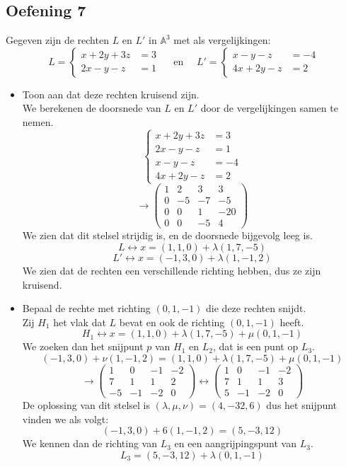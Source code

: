 \documentclass[main.tex]{subfiles}
\begin{document}
\subsection*{Oefening 7}
Gegeven zijn de rechten $L$ en $L'$ in $\mathbb{A}^{3}$ met als vergelijkingen:
\[
L = 
\left\{
\begin{array}{cl}
x + 2y + 3z &= 3\\
2x -y -z &= 1    
\end{array}
\right.
\quad\text{ en }\quad
L' = 
\left\{
\begin{array}{cl}
x - y - z &= -4\\
4x +2y -z &= 2
\end{array}
\right.
\]
\begin{itemize}
\item Toon aan dat deze rechten kruisend zijn.\\
We berekenen de doorsnede van $L$ en $L'$ door de vergelijkingen samen te nemen.
\[
\left\{
\begin{array}{cl}
x + 2y + 3z &= 3\\
2x -y -z &= 1\\
x - y - z &= -4\\
4x +2y -z &= 2
\end{array}
\right.
\]
\[
\rightarrow
\begin{pmatrix}
  1 & 2 & 3 & 3\\
  0 &-5 &-7 &-5\\
  0 & 0 & 1 & -20\\
  0 & 0 &-5 & 4
\end{pmatrix}
\]
We zien dat dit stelsel strijdig is, en de doorsnede bijgevolg leeg is.
\[ L \leftrightarrow x = (1,1,0) + \lambda(1,7,-5) \]
\[ L' \leftrightarrow x = (-1,3,0) + \lambda(1,-1,2) \]
We zien dat de rechten een verschillende richting hebben, dus ze zijn kruisend.

\item Bepaal de rechte met richting $(0,1,-1)$ die deze rechten snijdt.\\
Zij $H_{1}$ het vlak dat $L$ bevat en ook de richting $(0,1,-1)$ heeft.
\[ H_{1} \leftrightarrow x = (1,1,0) + \lambda(1,7,-5) + \mu (0,1,-1) \]
We zoeken dan het snijpunt $p$ van $H_{1}$ en $L_{2}$, dat is een punt op $L_{3}$.
\[ (-1,3,0) + \nu(1,-1,2) = (1,1,0) + \lambda(1,7,-5) + \mu (0,1,-1) \]
\[
\rightarrow
\begin{pmatrix}
  1 & 0 &-1 &-2\\
  7 & 1 & 1 & 2\\
  -5 &-1 &-2 & 0
\end{pmatrix}
\leftrightarrow
\begin{pmatrix}
  1 & 0 &-1 &-2\\
  7 & 1 & 1 & 3\\
  5 &-1 &-2 & 0
\end{pmatrix}
\]
De oplossing van dit stelsel is $(\lambda,\mu,\nu) = (4,-32,6)$ dus het snijpunt vinden we als volgt:
\[ (-1,3,0) + 6(1,-1,2) = (5,-3,12) \]
We kennen dan de richting van $L_{3}$ en een aangrijpingspunt van $L_{3}$.
\[ L_{3} = (5,-3,12) + \lambda (0,1,-1) \]
\end{itemize}
\end{document}
